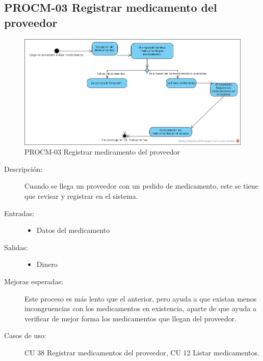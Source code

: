 \subsection{PROCM-03 Registrar medicamento del proveedor}

\begin{figure}[htbp]
	\begin{center}
		\includegraphics[width=.8\textwidth]{images/ToBEAgregarMedc}
		\caption{PROCM-03 Registrar medicamento del proveedor}
		\label{fig:proceso3}
	\end{center}
\end{figure}

\begin{description}
	\item[Descripción:] Cuando se llega un proveedor con un pedido de medicamento, 
	este se tiene que revisar y registrar en el sistema.
	\item[Entradas:] \cdtEmpty
        \begin{itemize}
			\item Datos del medicamento
        \end{itemize}
	\item[Salidas:] \cdtEmpty
        \begin{itemize}
			\item Dinero
        \end{itemize}	
    \item[Mejoras esperadas:] Este proceso es más lento que el anterior, pero ayuda a que existan menos incongruencias con los medicamentos en existencia, aparte de que ayuda a verificar de mejor forma los medicamentos que llegan del proveedor.
    \item[Casos de uso:] {CU 38 Registrar medicamentos del proveedor}, {CU 12 Listar medicamentos}.
\end{description}
